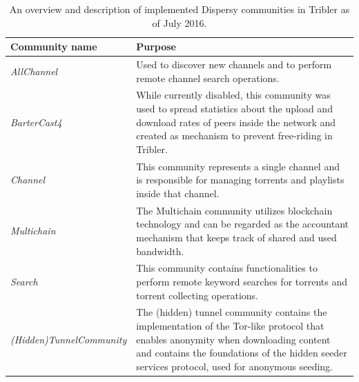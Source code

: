 \begin{table}
	\begin{tabularx}{\textwidth}{|l|X|}
		\hline
		\textbf{Community name} & \textbf{Purpose} \\ \hline
		\emph{AllChannel} & Used to discover new channels and to perform remote channel search operations.\\ \hline
		\emph{BarterCast4} & While currently disabled, this community was used to spread statistics about the upload and download rates of peers inside the network and created as mechanism to prevent free-riding in Tribler\cite{meulpolder2009bartercast}.\\ \hline
		\emph{Channel} & This community represents a single channel and is responsible for managing torrents and playlists inside that channel.\\ \hline
		\emph{Multichain} & The Multichain community utilizes blockchain technology and can be regarded as the accountant mechanism that keeps track of shared and used bandwidth.\\ \hline
		\emph{Search} & This community contains functionalities to perform remote keyword searches for torrents and torrent collecting operations.\\ \hline
		\emph{(Hidden)TunnelCommunity} & The (hidden) tunnel community contains the implementation of the Tor-like protocol that enables anonymity when downloading content and contains the foundations of the hidden seeder services protocol, used for anonymous seeding.\\ \hline
	\end{tabularx}
	\caption{An overview and description of implemented Dispersy communities in Tribler as of July 2016.}
	\label{table:dispersy-communities}
\end{table}


